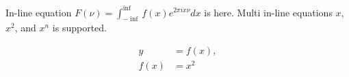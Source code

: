 
In-line equation $F(\nu) = \int_{-\inf}^{\inf} f(x) e^{2 \pi i x \nu} dx$ is here.
Multi in-line equations $x$, $x^2$, and $x^{n}$ is supported.

\begin{equation}
    \begin{split}
        y &= f(x), \\
        f(x) &= x^2
    \end{split}
\end{equation}


